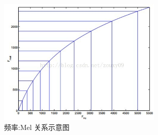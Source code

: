 \begin{enumerate}
\begin{figure}[h]
      \centering
      \includegraphics[width=0.7\textwidth]{figures/mel1.jpg}
      \caption{频率:Mel 关系示意图}
      \label{fig:mel1}
    \end{figure}
\end{enumerate}

